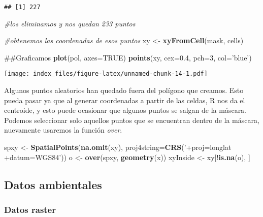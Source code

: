 \documentclass[]{article}
\newenvironment{Shaded}{\begin{snugshade}}{\end{snugshade}}
\newcommand{\KeywordTok}[1]{\textcolor[rgb]{0.13,0.29,0.53}{\textbf{{#1}}}}
\newcommand{\DataTypeTok}[1]{\textcolor[rgb]{0.13,0.29,0.53}{{#1}}}
\newcommand{\DecValTok}[1]{\textcolor[rgb]{0.00,0.00,0.81}{{#1}}}
\newcommand{\FloatTok}[1]{\textcolor[rgb]{0.00,0.00,0.81}{{#1}}}
\newcommand{\StringTok}[1]{\textcolor[rgb]{0.31,0.60,0.02}{{#1}}}
\newcommand{\CommentTok}[1]{\textcolor[rgb]{0.56,0.35,0.01}{\textit{{#1}}}}
\newcommand{\OtherTok}[1]{\textcolor[rgb]{0.56,0.35,0.01}{{#1}}}
\newcommand{\NormalTok}[1]{{#1}}
\begin{document}
\begin{verbatim}
## [1] 227
\end{verbatim}

\begin{Shaded}
\begin{Highlighting}[]
              \CommentTok{#los eliminamos y nos quedan 233 puntos }

\CommentTok{#obtenemos las coordenadas de esos puntos}
\NormalTok{xy <-}\StringTok{ }\KeywordTok{xyFromCell}\NormalTok{(mask, cells) }

\NormalTok{##Graficamos}
\KeywordTok{plot}\NormalTok{(pol, }\DataTypeTok{axes=}\OtherTok{TRUE}\NormalTok{)}
\KeywordTok{points}\NormalTok{(xy, }\DataTypeTok{cex=}\FloatTok{0.4}\NormalTok{, }\DataTypeTok{pch=}\DecValTok{3}\NormalTok{, }\DataTypeTok{col=}\StringTok{'blue'}\NormalTok{)}
\end{Highlighting}
\end{Shaded}

\texttt{[image: index\_files/figure-latex/unnamed-chunk-14-1.pdf]}

Algunos puntos aleatorios han quedado fuera del polígono que creamos.
Esto pueda pasar ya que al generar coordenadas a partir de las celdas, R
nos da el centroide, y esto puede ocasionar que algunos puntos se salgan
de la máscara. Podemos seleccionar solo aquellos puntos que se
encuentran dentro de la máscara, nuevamente usaremos la función
\emph{over}.

\begin{Shaded}
\begin{Highlighting}[]
\NormalTok{spxy <-}\StringTok{ }\KeywordTok{SpatialPoints}\NormalTok{(}\KeywordTok{na.omit}\NormalTok{(xy), }\DataTypeTok{proj4string=}\KeywordTok{CRS}\NormalTok{(}\StringTok{'+proj=longlat +datum=WGS84'}\NormalTok{))}
\NormalTok{o <-}\StringTok{ }\KeywordTok{over}\NormalTok{(spxy, }\KeywordTok{geometry}\NormalTok{(x))}
\NormalTok{xyInside <-}\StringTok{ }\NormalTok{xy[!}\KeywordTok{is.na}\NormalTok{(o), ]}
\end{Highlighting}
\end{Shaded}

\subsection{Datos ambientales}\label{datos-ambientales}

\subsubsection{Datos raster}\label{datos-raster}
\end{document}
